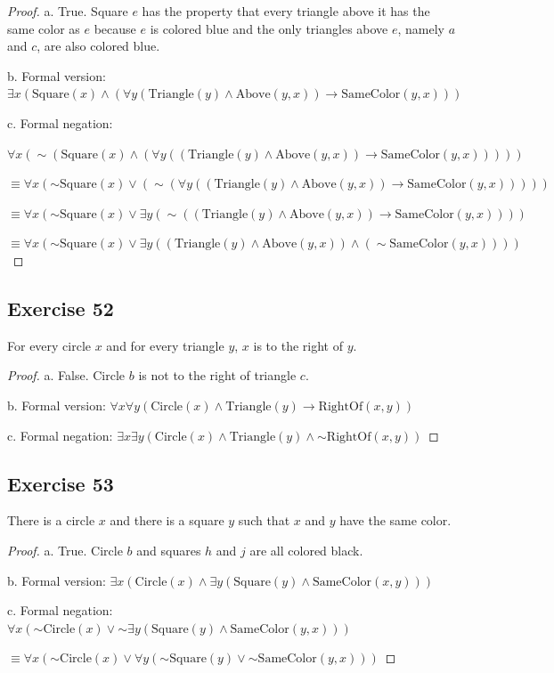\documentclass[14pt]{extarticle}
\newcommand{\fa}{\forall}
\newcommand{\te}{\exists}
\begin{document}
\begin{proof}
a. True. Square $e$ has the property that every triangle above it has the same color as $e$ because $e$ is colored blue and the only triangles above $e$, namely $a$ and $c$, are also colored blue.

b. Formal version: $\te x(\text{Square}(x) \wedge (\fa y(\text{Triangle}(y) \wedge \text{Above}(y, x)) \to \text{SameColor}(y, x)))$

c. Formal negation: 

$\fa x({\sim(\text{Square}(x) \wedge (\fa y((\text{Triangle}(y) \wedge \text{Above}(y, x)) \to \text{SameColor}(y, x))))})$

$\equiv \fa x({\sim \text{Square}(x)} \vee ({\sim(\fa y((\text{Triangle}(y) \wedge \text{Above}(y, x)) \to \text{SameColor}(y, x)))}))$

$\equiv \fa x({\sim \text{Square}(x)} \vee \te y({\sim((\text{Triangle}(y) \wedge \text{Above}(y, x)) \to \text{SameColor}(y, x))}))$

$\equiv \fa x({\sim\text{Square}(x)} \vee \te y((\text{Triangle}(y) \wedge \text{Above}(y, x)) \wedge ({\sim\text{SameColor}(y, x)})))$
\end{proof}

\subsection{Exercise 52}
For every circle $x$ and for every triangle $y$, $x$ is to the right of $y$.

\begin{proof}
a. False. Circle $b$ is not to the right of triangle $c$.

b. Formal version: $\fa x \fa y (\text{Circle}(x) \wedge \text{Triangle}(y) \to \text{RightOf}(x, y))$

c. Formal negation: $\te x \te y (\text{Circle}(x) \wedge \text{Triangle}(y) \wedge {\sim\text{RightOf}(x, y)})$
\end{proof}

\subsection{Exercise 53}
There is a circle $x$ and there is a square $y$ such that $x$ and $y$ have the same color.

\begin{proof}
a. True. Circle $b$ and squares $h$ and $j$ are all colored
black.

b. Formal version: $\te x(\text{Circle}(x) \wedge \te y(\text{Square}(y) \wedge \text{SameColor}(x, y)))$

c. Formal negation: $\fa x({\sim\text{Circle}(x)} \vee {\sim \te y(\text{Square}(y) \wedge \text{SameColor}(y, x))})$

$\equiv \fa x({\sim\text{Circle}(x)} \vee \fa y({\sim\text{Square}(y)} \vee {\sim\text{SameColor}(y, x)}))$
\end{proof}
\end{document}
